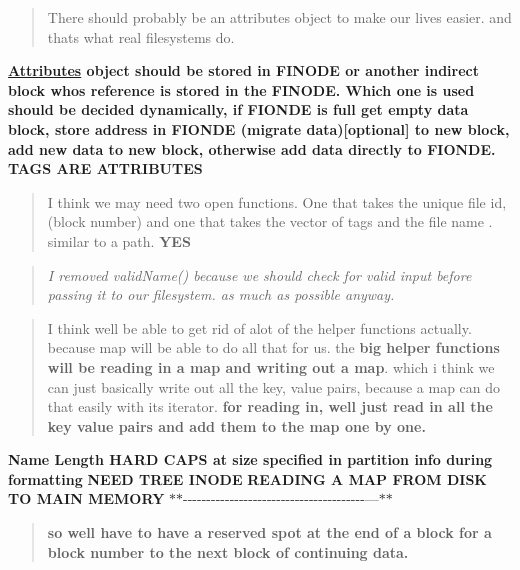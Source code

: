 \begin{quote}
There should probably be an attributes object to make our lives easier. and thats what real filesystems do. \end{quote}
{\bfseries \mbox{\hyperlink{classAttributes}{Attributes}} object should be stored in F\+I\+N\+O\+DE or another indirect block who\textquotesingle{}s reference is stored in the F\+I\+N\+O\+DE. Which one is used should be decided dynamically, if F\+I\+O\+N\+DE is full get empty data block, store address in F\+I\+O\+N\+DE (migrate data)\mbox{[}optional\mbox{]} to new block, add new data to new block, otherwise add data directly to F\+I\+O\+N\+DE. T\+A\+GS A\+RE A\+T\+T\+R\+I\+B\+U\+T\+ES}

\begin{quote}
I think we may need two open functions. One that takes the unique file id,(block number) and one that takes the vector of tags and the file name . similar to a path. {\bfseries Y\+ES} \end{quote}


\begin{quote}
{\itshape I removed valid\+Name() because we should check for valid input before passing it to our filesystem. as much as possible anyway.} \end{quote}


\begin{quote}
I think we\textquotesingle{}ll be able to get rid of alot of the helper functions actually. because map will be able to do all that for us. the {\bfseries big helper functions will be reading in a map and writing out a map}. which i think we can just basically write out all the key, value pairs, because a map can do that easily with its iterator. {\bfseries for reading in, we\textquotesingle{}ll just read in all the key value pairs and add them to the map one by one.} \end{quote}
{\bfseries Name Length H\+A\+RD C\+A\+PS at size specified in partition info during formatting} {\bfseries N\+E\+ED T\+R\+EE I\+N\+O\+DE} {\bfseries R\+E\+A\+D\+I\+NG A M\+AP F\+R\+OM D\+I\+SK TO M\+A\+IN M\+E\+M\+O\+RY} $\ast$$\ast$-\/-\/-\/-\/-\/-\/-\/-\/-\/-\/-\/-\/-\/-\/-\/-\/-\/-\/-\/-\/-\/-\/-\/-\/-\/-\/-\/-\/-\/-\/-\/-\/-\/-\/-\/-\/-\/-\/-\/---$\ast$$\ast$

\begin{quote}
{\bfseries so we\textquotesingle{}ll have to have a reserved spot at the end of a block for a block number to the next block of continuing data.} \end{quote}


